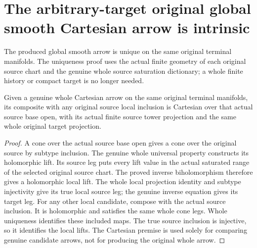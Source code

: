 \section{The arbitrary-target original global smooth Cartesian arrow is intrinsic}

The produced global smooth arrow is unique on the same original terminal
manifolds. The uniqueness proof uses the actual finite geometry of each
original source chart and the genuine whole source saturation dictionary;
a whole finite history or compact target is no longer needed.

\begin{lemma}
\label{hir:actual-original-global-cartesian-square-source-chart-restriction}
\leanok
{}
Given a genuine whole Cartesian arrow on the same original terminal
manifolds, its composite with any original source local inclusion is
Cartesian over that actual source base open, with its actual finite source
tower projection and the same whole original target projection.
\end{lemma}
\begin{proof}
A cone over the actual source base open gives a cone over the original
source by subtype inclusion. The genuine whole universal property
constructs its holomorphic lift. Its source leg puts every lift value in
the actual saturated range of the selected original source chart. The
proved inverse biholomorphism therefore gives a holomorphic local lift.
The whole local projection identity and subtype injectivity give its true
local source leg; the genuine inverse equation gives its target leg.
For any other local candidate, compose with the actual source inclusion.
It is holomorphic and satisfies the same whole cone legs. Whole uniqueness
identifies these included maps. The true source inclusion is injective,
so it identifies the local lifts. The Cartesian premise is used solely
for comparing genuine candidate arrows, not for producing the original
whole arrow.
\end{proof}

